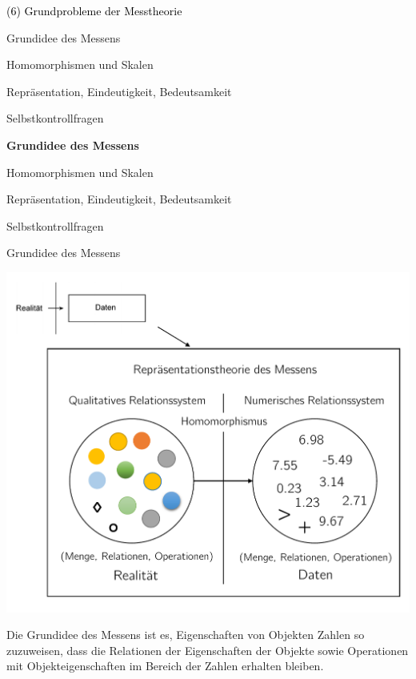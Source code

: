 \documentclass[
  8pt,
  ignorenonframetext,
]{beamer}
\begin{document}
\begin{frame}[plain]{}
\protect\hypertarget{section-2}{}
\vfill
\center
\huge

\textcolor{black}{(6) Grundprobleme der Messtheorie} \vfill
\end{frame}

\begin{frame}{}
\protect\hypertarget{section-3}{}
\vfill
\Large
{}

Grundidee des Messens

Homomorphismen und Skalen

Repräsentation, Eindeutigkeit, Bedeutsamkeit

Selbstkontrollfragen \vfill
\end{frame}

\begin{frame}{}
\protect\hypertarget{section-4}{}
\vfill
\Large
{}

\textbf{Grundidee des Messens}

Homomorphismen und Skalen

Repräsentation, Eindeutigkeit, Bedeutsamkeit

Selbstkontrollfragen \vfill
\end{frame}

\begin{frame}{Grundidee des Messens}
\protect\hypertarget{grundidee-des-messens}{}
\begin{center}\includegraphics[width=0.7\linewidth]{6_Abbildungen/pfm_6_messtheorie} \end{center}

\footnotesize
\center

Die Grundidee des Messens ist es, Eigenschaften von Objekten Zahlen so
zuzuweisen, dass die Relationen der Eigenschaften der Objekte sowie
Operationen mit Objekteigenschaften im Bereich der Zahlen erhalten
bleiben.
\end{frame}
\end{document}
